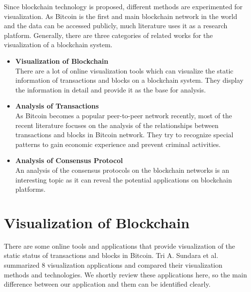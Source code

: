 Since blockchain technology is proposed, different methods are experimented for visualization. As Bitcoin is the first and main blockchain network in the world and the data can be accessed publicly, much literature uses it as a research platform. Generally, there are three categories of related works for the visualization of a blockchain system.
\begin{itemize}
    \item \textbf{Visualization of Blockchain} \\
        There are a lot of online visualization tools which can visualize the static information of transactions and blocks on a blockchain system. They display the information in detail and provide it as the base for analysis.
    \item \textbf{Analysis of Transactions} \\
        As Bitcoin becomes a popular peer-to-peer network recently, most of the recent literature focuses on the analysis of the relationships between transactions and blocks in Bitcoin network. They try to recognize special patterns to gain economic experience and prevent criminal activities.
    \item \textbf{Analysis of Consensus Protocol} \\
        An analysis of the consensus protocols on the blockchain networks is an interesting topic as it can reveal the potential applications on blockchain platforms.
\end{itemize}

\section{Visualization of Blockchain}

There are some online tools and applications that provide visualization of the static status of transactions and blocks in Bitcoin. Tri A. Sundara et al. \cite{Sundara2017} summarized 8 visualization applications and compared their visualization methods and technologies. We shortly review these applications here, so the main difference between our application and them can be identified clearly.
\clearpage

